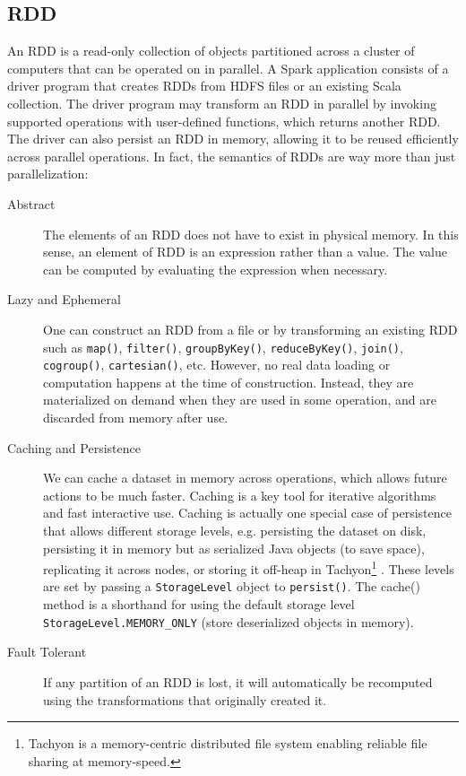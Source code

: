 \documentclass[11pt]{book}
\begin{document}
\subsection{RDD}
An RDD is a read-only collection of objects partitioned across a cluster of computers that can be operated on in parallel. A Spark application consists of a driver program that creates RDDs from HDFS files or an existing Scala collection. The driver program may transform an RDD in parallel by invoking supported operations with user-defined functions, which returns another RDD. The driver can also persist an RDD in memory, allowing it to be reused efficiently across parallel operations.
In fact, the semantics of RDDs are way more than just parallelization:
\begin{description}
\item[Abstract]
The elements of an RDD does not have to exist in physical memory. In this sense, an element of RDD is an expression rather than a value. The value can be computed by evaluating the expression when necessary.
\item[Lazy and Ephemeral]
One can construct an RDD from a file or by transforming an existing RDD such as \texttt{map()}, \texttt{filter()}, \texttt{groupByKey()}, \texttt{reduceByKey()}, \texttt{join()}, \texttt{cogroup()}, \texttt{cartesian()}, etc. However, no real data loading or computation happens at the time of construction. Instead, they are materialized on demand when they are used in some operation, and are discarded from memory after use.
\item[Caching and Persistence]
We can cache a dataset in memory across operations, which allows future actions to be much faster. Caching is a key tool for iterative algorithms and fast interactive use. Caching is actually one special case of  persistence that allows different storage levels, e.g. persisting the dataset on disk, persisting it in memory but as serialized Java objects (to save space), replicating it across nodes, or storing it off-heap in Tachyon\footnote{Tachyon is a memory-centric distributed file system enabling reliable file sharing at memory-speed.} \cite{Tachyon}. These levels are set by passing a \texttt{StorageLevel} object to \texttt{persist()}. The cache() method is a shorthand for using the default storage level \texttt{StorageLevel.MEMORY\_ONLY} (store deserialized objects in memory).
\item[Fault Tolerant]
If any partition of an RDD is lost, it will automatically be recomputed using the transformations that originally created it.
\end{description}
\end{document}
